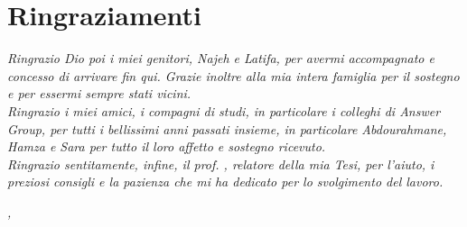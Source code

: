 
\cleardoublepage
{}
{}



\bigskip

\begingroup
\let\clearpage\relax
\let\cleardoublepage\relax
\let\cleardoublepage\relax

\chapter*{Ringraziamenti}


\noindent \textit{Ringrazio Dio poi i miei genitori, Najeh e Latifa, per avermi accompagnato e concesso di arrivare fin qui. Grazie inoltre alla mia intera famiglia per il sostegno e per essermi sempre stati vicini.}\\

\noindent \textit{Ringrazio i miei amici, i compagni di studi, in particolare i colleghi di Answer Group, per tutti i bellissimi anni passati insieme, in particolare Abdourahmane, Hamza e Sara per tutto il loro affetto e sostegno ricevuto.}\\


\noindent \textit{Ringrazio sentitamente, infine, il prof. \myProf, relatore della mia Tesi, per
l'aiuto, i preziosi consigli e la pazienza che mi ha dedicato per lo svolgimento del lavoro.}\\

\bigskip

\noindent\textit{\myLocation, \myTime}
\hfill \myName

\endgroup

\blankpage
\blankpage

